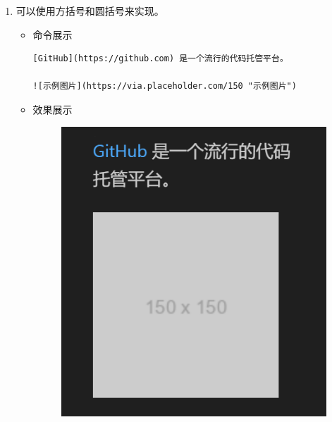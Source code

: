 \documentclass[UTF8]{ctexart}
\begin{document}
\begin{enumerate}
  \item 可以使用方括号和圆括号来实现。
  \begin{itemize}
  \item 命令展示
  \begin{verbatim}
[GitHub](https://github.com) 是一个流行的代码托管平台。

![示例图片](https://via.placeholder.com/150 "示例图片")

  \end{verbatim}
\item 效果展示

 \begin{figure}[H]
   
    \includegraphics[width=\textwidth]{45} %
   
  \end{figure}

  \end{itemize}
\end{enumerate}
\end{document}
